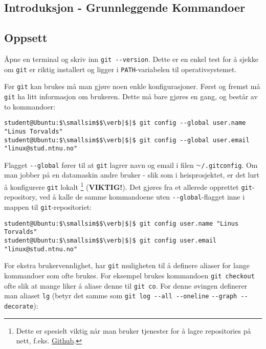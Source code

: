 \begin{alphasection}
\section{Introduksjon - Grunnleggende Kommandoer}\label{sec:innføring}

\subsection{Oppsett}

Åpne en terminal og skriv inn \verb|git --version|. Dette er en enkel test for å sjekke om \verb|git| er riktig installert og ligger i \verb|PATH|-variabelen til operativsystemet.


Før \verb|git| kan brukes må man gjøre noen enkle konfigurasjoner. Først og fremst må \verb|git| ha litt informasjon om brukeren. Dette må bare gjøres en gang, og består av to kommandoer:

\begin{lstlisting}[mathescape=true]
student@Ubuntu:$\smallsim$$\verb|$|$ git config --global user.name "Linus Torvalds"
student@Ubuntu:$\smallsim$$\verb|$|$ git config --global user.email "linux@stud.ntnu.no"
\end{lstlisting}


Flagget \verb|--global| fører til at \verb|git| lagrer navn og email i filen \texttt{$\smallsim$/.gitconfig}. Om man jobber på en datamaskin andre bruker - slik som i heisprosjektet, er det lurt å konfigurere \verb|git| lokalt \footnote{Dette er spesielt viktig når man bruker tjenester for å lagre repositories på nett, f.eks. \href{https://github.com/about}{Github}.} (\textbf{VIKTIG!}). Det gjøres fra et allerede opprettet \verb|git|-repository, ved å kalle de samme kommandoene uten \verb|--global|-flagget inne i mappen til \verb|git|-repositoriet:

\begin{lstlisting}[mathescape=true]
student@Ubuntu:$\smallsim$$\verb|$|$ git config user.name "Linus Torvalds"
student@Ubuntu:$\smallsim$$\verb|$|$ git config user.email "linux@stud.ntnu.no"
\end{lstlisting}

For ekstra brukervennlighet, har \verb|git| muligheten til å definere aliaser for lange kommandoer som ofte brukes. For eksempel brukes kommandoen \verb|git checkout| ofte slik at mange liker å aliase denne til \verb|git co|. For denne øvingen definerer man aliaset \verb|lg| (betyr det samme som \verb|git log --all --oneline| \verb|--graph --decorate|):


\end{alphasection}
